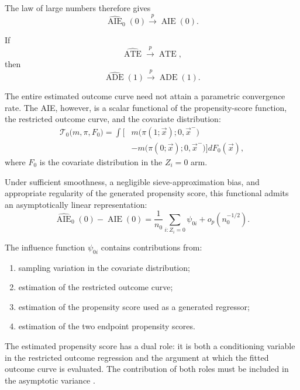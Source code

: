 The law of large numbers therefore gives
\[
    \widehat{\operatorname{AIE}}_0(0)
    \overset{p}{\longrightarrow}
    \operatorname{AIE}(0).
    \label{eqn:aie0-estimator-consistency}
\]

If
\[
    \widehat{\operatorname{ATE}}
    \overset{p}{\longrightarrow}
    \operatorname{ATE},
\]
then
\[
    \widehat{\operatorname{ADE}}(1)
    \overset{p}{\longrightarrow}
    \operatorname{ADE}(1).
    \label{eqn:ade1-estimator-consistency}
\]

The entire estimated outcome curve need not attain a parametric convergence rate.
The AIE, however, is a scalar functional of the propensity-score function, the restricted outcome curve, and the covariate distribution:
\[
    \begin{aligned}
    \mathcal T_0
    \big(
        m,\pi,F_0
    \big)
    =
    \int
    \Big[
        &
        m
        \big(
            \pi(1;\vec x);
            0,
            \vec x^-
        \big)
        \\
        &-
        m
        \big(
            \pi(0;\vec x);
            0,
            \vec x^-
        \big)
    \Big]
    dF_0(\vec x),
    \end{aligned}
\]
where $F_0$ is the covariate distribution in the $Z_i=0$ arm.

Under sufficient smoothness, a negligible sieve-approximation bias, and appropriate regularity of the generated propensity score, this functional admits an asymptotically linear representation:
\[
    \widehat{\operatorname{AIE}}_0(0)
    -
    \operatorname{AIE}(0)
    =
    \frac{1}{n_0}
    \sum_{i:Z_i=0}
        \psi_{0i}
    +
    o_p
    \left(
        n_0^{-1/2}
    \right).
    \label{eqn:aie0-asymptotic-linearity}
\]

The influence function $\psi_{0i}$ contains contributions from:

\begin{enumerate}[label=\textnormal{(\roman*)}]
    \item sampling variation in the covariate distribution;
    \item estimation of the restricted outcome curve;
    \item estimation of the propensity score used as a generated regressor;
    \item estimation of the two endpoint propensity scores.
\end{enumerate}

The estimated propensity score has a dual role: it is both a conditioning variable in the restricted outcome regression and the argument at which the fitted outcome curve is evaluated.
The contribution of both roles must be included in the asymptotic variance \citep{hahn2013asymptotic}.

